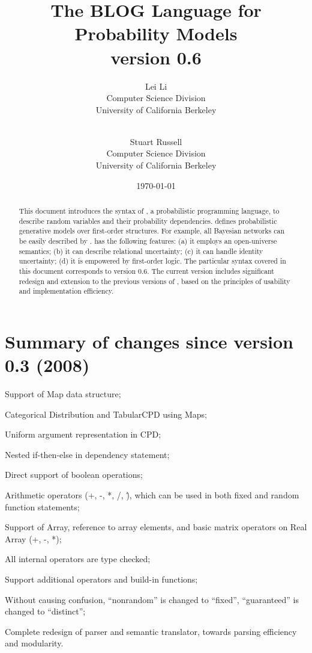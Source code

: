 \documentclass[12pt]{article}
\title{The BLOG Language for Probability Models\\ {version 0.6}}
\author{Lei Li\\
              Computer Science Division\\
              University of California Berkeley\\
               \email{leili@cs.berkeley.edu}\\
\and
               Stuart Russell\\
              Computer Science Division\\
              University of California Berkeley\\
               \email{russell@cs.berkeley.edu}
               }
\date{\today}
\begin{document}
\maketitle


\begin{abstract}
This document introduces the syntax of \bl, a probabilistic programming language, to describe random variables and their probability dependencies.  
\bl defines probabilistic generative models over first-order structures. For example, all Bayesian networks can be easily described by \bl.  
\bl has the following features: 
(a) it employs an open-universe semantics;
(b) it can describe relational uncertainty;
(c) it can handle identity uncertainty;
(d) it is empowered by first-order logic.
The particular syntax covered in this document corresponds to \bl version 0.6. The current version includes significant redesign and extension to the previous versions of \bl, based on the principles of usability and implementation efficiency. 
\end{abstract}


\tableofcontents

\section{Summary of changes since version 0.3 (2008)}
\begin{itemize*}
\item Support of Map data structure;
\item Categorical Distribution and TabularCPD using Maps;
\item Uniform argument representation in CPD;
\item Nested if-then-else in dependency statement;
\item Direct support of boolean operations;
\item Arithmetic operators (+, -, *, /, \^), which can be used in both fixed and random function statements;
\item Support of Array, reference to array elements, and basic matrix operators on Real Array (+, -, *);
\item All internal operators are type checked;
\item Support additional operators and build-in functions; 
\item Without causing confusion, ``nonrandom'' is changed to ``fixed'', ``guaranteed'' is changed to ``distinct'';
\item Complete redesign of parser and semantic translator, towards parsing efficiency and modularity.
\end{itemize*}
\end{document}
